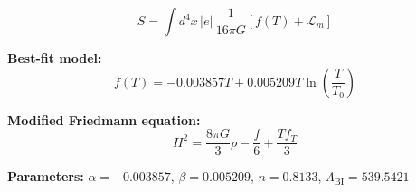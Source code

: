 
\begin{equation}
  S = \int d^4x \, |e| \, \frac{1}{16\pi G} \left[ f(T) + \mathcal{L}_m \right]
\end{equation}

\textbf{Best-fit model:}
\begin{equation}
  f(T) = -0.003857 T + 0.005209 T \ln\!\left(\frac{T}{T_0}\right)
\end{equation}

\textbf{Modified Friedmann equation:}
\begin{equation}
  H^2 = \frac{8\pi G}{3} \rho - \frac{f}{6} + \frac{T f_T}{3}
\end{equation}

\textbf{Parameters:}
$\alpha = -0.003857$, \quad
$\beta = 0.005209$, \quad
$n = 0.8133$, \quad
$\Lambda_{\text{BI}} = 539.5421$